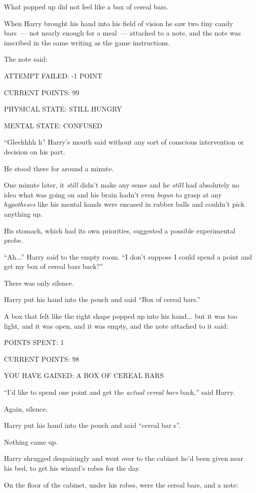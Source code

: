 What popped up did not feel like a box of cereal bars.

When Harry brought his hand into his field of vision he saw two tiny candy bars~--- not nearly enough for a meal~--- attached to a note, and the note was inscribed in the same writing as the game instructions.

The note said:

ATTEMPT FAILED: -1 POINT

CURRENT POINTS: 99

PHYSICAL STATE: STILL HUNGRY

MENTAL STATE: CONFUSED

``Gleehhhh h'' Harry's mouth said without any sort of conscious intervention or decision on his part.

He stood there for around a minute.

One minute later, it \emph{still} didn't make any sense and he \emph{still} had absolutely no idea what was going on and his brain hadn't even \emph{begun} to grasp at any \emph{hypotheses} like his mental hands were encased in rubber balls and couldn't pick anything up.

His stomach, which had its own priorities, suggested a possible experimental probe.

``Ah...'' Harry said to the empty room. ``I don't suppose I could spend a point and get my box of cereal bars back?''

There was only silence.

Harry put his hand into the pouch and said ``Box of cereal bars.''

A box that felt like the right shape popped up into his hand... but it was too light, and it was open, and it was empty, and the note attached to it said:

POINTS SPENT: 1

CURRENT POINTS: 98

YOU HAVE GAINED: A BOX OF CEREAL BARS

``I'd like to spend one point and get the \emph{actual cereal bars} back,'' said Harry.

Again, silence.

Harry put his hand into the pouch and said ``cereal bar s''.

Nothing came up.

Harry shrugged despairingly and went over to the cabinet he'd been given near his bed, to get his wizard's robes for the day.

On the floor of the cabinet, under his robes, were the cereal bars, and a note:

